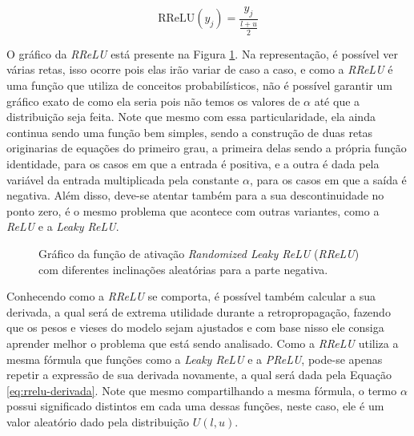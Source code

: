 \begin{equation}
    \text{RReLU}(y_j) = \frac{y_j}{\frac{l + u}{2}}
    \label{eq:equacao-rrelu-teste}
\end{equation}

O gráfico da \textit{RReLU} está presente na Figura \ref{fig:rrelu}. Na representação, é possível ver várias retas, isso ocorre pois elas irão variar de caso a caso, e como a \textit{RReLU} é uma função que utiliza de conceitos probabilísticos, não é possível garantir um gráfico exato de como ela seria pois não temos os valores de $\alpha$ até que a distribuição seja feita. Note que mesmo com essa particularidade, ela ainda continua sendo uma função bem simples, sendo a construção de duas retas originarias de equações do primeiro grau, a primeira delas sendo a própria função identidade, para os casos em que a entrada é positiva, e a outra é dada pela variável da entrada multiplicada pela constante $\alpha$, para os casos em que a saída é negativa. Além disso, deve-se atentar também para a sua descontinuidade no ponto zero, é o mesmo problema que acontece com outras variantes, como a \textit{ReLU} e a \textit{Leaky ReLU}.

\begin{figure}[h!]
    \centering
    \caption{Gráfico da função de ativação \textit{Randomized Leaky ReLU} (\textit{RReLU}) com diferentes inclinações aleatórias para a parte negativa.}
    \label{fig:rrelu}
\end{figure}

Conhecendo como a \textit{RReLU} se comporta, é possível também calcular a sua derivada, a qual será de extrema utilidade durante a retropropagação, fazendo que os pesos e vieses do modelo sejam ajustados e com base nisso ele consiga aprender melhor o problema que está sendo analisado. Como a \textit{RReLU} utiliza a mesma fórmula que funções como a \textit{Leaky ReLU} e a \textit{PReLU}, pode-se apenas repetir a expressão de sua derivada novamente, a qual será dada pela Equação \ref{eq:rrelu-derivada}. Note que mesmo compartilhando a mesma fórmula, o termo $\alpha$ possui significado distintos em cada uma dessas funções, neste caso, ele é um valor aleatório dado pela distribuição $U(l, u)$.

